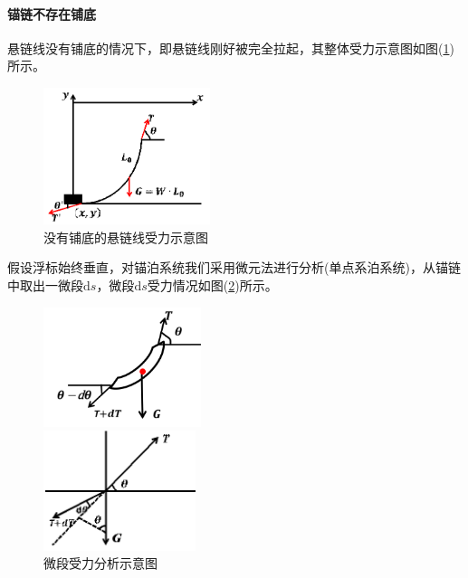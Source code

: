 \documentclass[UTF8]{ctexbook}
\theoremstyle{nonumberplain}
\begin{document}
            \paragraph{锚链不存在铺底}悬链线没有铺底的情况下，即悬链线刚好被完全拉起，其整体受力示意图如图(\ref{fig:没有铺底的悬链线受力示意图})所示。
            \begin{figure}[H]
            \centering
            \includegraphics[height=4cm]{images/no_bottom_chain.jpg}
            \caption{没有铺底的悬链线受力示意图}
            \label{fig:没有铺底的悬链线受力示意图}
            \end{figure}
            \par
            假设浮标始终垂直，对锚泊系统我们采用微元法进行分析(单点系泊系统)，从锚链中取出一微段$\mathrm{d}s$，微段$\mathrm{d}s$受力情况如图(\ref{fig:微段受力分析示意图})所示。
            \begin{figure}[H]
              \centering
              \begin{varwidth}[t]{\textwidth}
                \vspace{0pt}
                \includegraphics[height=3.5cm]{images/micro_segmehts1.jpg}
              \end{varwidth}
              \qquad
              \begin{varwidth}[t]{\textwidth}
                \vspace{0pt}
                \includegraphics[height=3.5cm]{images/micro_segmehts2.jpg}
              \end{varwidth}
            \caption{微段受力分析示意图}
            \label{fig:微段受力分析示意图}
            \end{figure}
\end{document}
